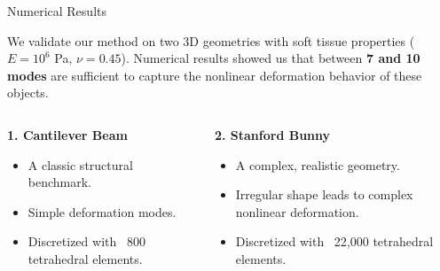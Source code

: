 \documentclass[9pt]{beamer}
\begin{document}
\begin{frame}{Numerical Results}
    
    We validate our method on two 3D geometries with soft tissue properties ($E = 10^6$ Pa, $\nu = 0.45$). Numerical results showed us that between \textbf{7 and 10 modes} are sufficient to capture the nonlinear deformation behavior of these objects.
    
    \begin{columns}[T]
        \begin{column}{0.45\textwidth}
            \textbf{1. Cantilever Beam}
            \begin{itemize}
                \item A classic structural benchmark.
                \item Simple deformation modes.
                \item Discretized with ~800 tetrahedral elements.
            \end{itemize}
        \end{column}
        
        \begin{column}{0.55\textwidth}
            \textbf{2. Stanford Bunny}
            \begin{itemize}
                \item A complex, realistic geometry.
                \item Irregular shape leads to complex nonlinear deformation.
                \item Discretized with ~22,000 tetrahedral elements.
            \end{itemize}
    
        \end{column}
    \end{columns}
\end{frame}
\end{document}
